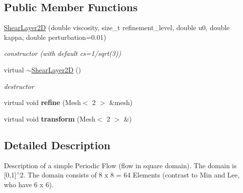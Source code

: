 \subsection*{Public Member Functions}
\begin{DoxyCompactItemize}
\item 
\hyperlink{classnatrium_1_1ShearLayer2D_a5428379aab66e023c11f11ff86d53546}{ShearLayer2D} (double viscosity, size\_\-t refinement\_\-level, double u0, double kappa, double perturbation=0.01)
\begin{DoxyCompactList}\small\item\em constructor (with default cs=1/sqrt(3)) \item\end{DoxyCompactList}\item 
\hypertarget{classnatrium_1_1ShearLayer2D_ac15c8dc03cc5a7fbb594b863ddac4bce}{
virtual \hyperlink{classnatrium_1_1ShearLayer2D_ac15c8dc03cc5a7fbb594b863ddac4bce}{$\sim$ShearLayer2D} ()}
\label{classnatrium_1_1ShearLayer2D_ac15c8dc03cc5a7fbb594b863ddac4bce}

\begin{DoxyCompactList}\small\item\em destructor \item\end{DoxyCompactList}\item 
\hypertarget{classnatrium_1_1ShearLayer2D_a58306e2c321765071614fbd1839ae1ee}{
virtual void {\bfseries refine} (Mesh$<$ 2 $>$ \&mesh)}
\label{classnatrium_1_1ShearLayer2D_a58306e2c321765071614fbd1839ae1ee}

\item 
\hypertarget{classnatrium_1_1ShearLayer2D_a6e4e7f310f4180650700ce3167a8f6a1}{
virtual void {\bfseries transform} (Mesh$<$ 2 $>$ \&)}
\label{classnatrium_1_1ShearLayer2D_a6e4e7f310f4180650700ce3167a8f6a1}

\end{DoxyCompactItemize}


\subsection{Detailed Description}
Description of a simple Periodic Flow (flow in square domain). The domain is \mbox{[}0,1\mbox{]}$^\wedge$2. The domain consists of 8 x 8 = 64 Elements (contrast to Min and Lee, who have 6 x 6). 

